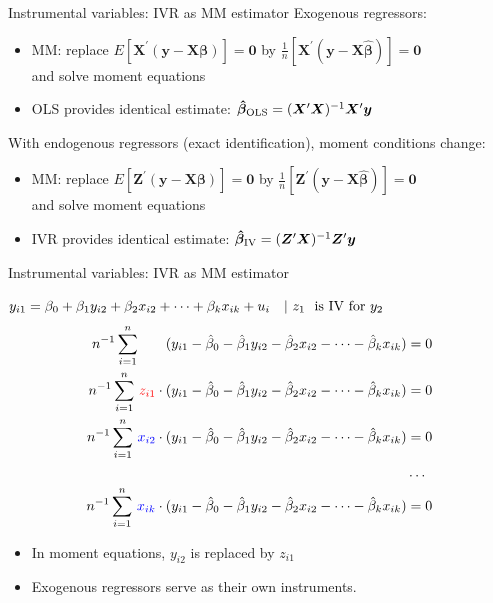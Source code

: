 \documentclass[usenames,dvipsnames]{beamer}
\begin{document}
\begin{frame}{Instrumental variables: IVR as MM estimator}
Exogenous regressors:
\medskip
\begin{itemize}
    \item MM: replace $E[\bm{X}^{\prime}(\bm{y}-\bm{X\beta})]=\bm{0}$ by $\frac{1}{n}[\bm{X}^{\prime}(\bm{y}-\bm{X\hat{\beta}})]=\bm{0}$\\and solve moment equations
    \medskip
    \item OLS provides identical estimate: $\bm{\hat{\beta}}_{\textnormal{OLS}} = (\bm{X}^{\prime}\bm{X})^{-1} \bm{X}^{\prime}\bm{y} $
\end{itemize}
\bigskip
With endogenous regressors (exact identification), moment conditions change:
\medskip
\begin{itemize}
    \item MM: replace $E[\bm{Z}^{\prime}(\bm{y}-\bm{X\beta})]=\bm{0}$ by $\frac{1}{n}[\bm{Z}^{\prime}(\bm{y}-\bm{X\hat{\beta}})]=\bm{0}$\\and solve moment equations
    \medskip
    \item IVR provides identical estimate: $\bm{\hat{\beta}}_{\textnormal{IV}} = (\bm{Z}^{\prime}\bm{X})^{-1} \bm{Z}^{\prime}\bm{y} $
\end{itemize}

\end{frame}
\begin{frame}{Instrumental variables: IVR as MM estimator}

$y_{i1}=\beta_0 + \beta_1 y_{i2} + \beta_2 x_{i2} + \dots + \beta_k x_{ik} + u_{i} \quad|~z_1 \textnormal{~ is IV for } y_2$\\
\begin{align*}
n^{-1} \sum_{i=1}^n ~~~~~~(y_{i1}-\hat{\beta}_0-\hat{\beta}_1 y_{i2}-\hat{\beta}_2 x_{i2}- \dots- \hat{\beta}_k x_{ik})&=0 \\
n^{-1} \sum_{i=1}^n \, \textcolor{red}{z_{i1}} \cdot (y_{i1}-\hat{\beta}_0-\hat{\beta}_1 y_{i2}-\hat{\beta}_2 x_{i2}- \dots- \hat{\beta}_k x_{ik})&=0 \\
n^{-1} \sum_{i=1}^n \, \textcolor{blue}{x_{i2}} \cdot (y_{i1}-\hat{\beta}_0-\hat{\beta}_1 y_{i2}-\hat{\beta}_2 x_{i2}- \dots- \hat{\beta}_k x_{ik})&=0 \\
       & \dots \\
n^{-1} \sum_{i=1}^n \, \textcolor{blue}{x_{ik}} \cdot (y_{i1}-\hat{\beta}_0-\hat{\beta}_1 y_{i2}-\hat{\beta}_2 x_{i2}- \dots- \hat{\beta}_k x_{ik})&=0
\end{align*} 
\vspace{-0.5cm}
\begin{itemize}
    \item In moment equations, $y_{i2}$ is replaced by $z_{i1}$
    \item Exogenous regressors serve as their own instruments.
\end{itemize}
\end{frame}
\end{document}
